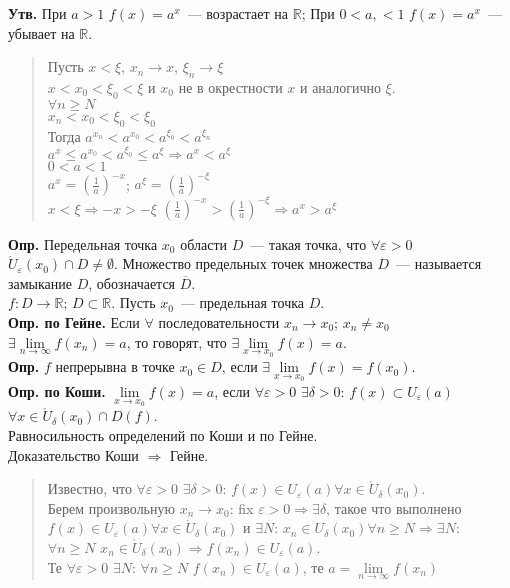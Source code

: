 \documentclass{article}
\begin{document}
	\textbf{Утв.} При $a > 1$ $f(x) = a^x$~--- возрастает на $\mathbb{R}$; При $0 < a,< 1$ $f(x) = a^x$~--- убывает на $\mathbb{R}$.
	\begin{quote}
		Пусть $x < \xi$, $x_n \rightarrow x$, $\xi_n \rightarrow \xi$ \\
		$x < x_0 < \xi_0 < \xi$ и $x_0$ не в окрестности $x$ и аналогично $\xi$. \\
		$\forall n \geqslant N$ \\
		$x_n < x_0 < \xi_0 < \xi_0$ \\
		Тогда $a^{x_n} < a^{x_0} < a^{\xi_0} < a^{\xi_n}$ \\
		$a^{x} \leqslant a^{x_0} < a^{\xi_0} \leqslant a^{\xi} \Rightarrow a^x < a^{\xi}$ \\
		$0 < a < 1$ \\
		$a^x = (\frac{1}{a})^{-x}$; $a^{\xi} = (\frac{1}{a})^{-\xi}$ \\
		$x < \xi \Rightarrow -x > -\xi$ $(\frac{1}{a})^{-x} > (\frac{1}{a})^{-\xi} \Rightarrow a^x > a^{\xi}$ \\
	\end{quote}
	\textbf{Опр.} Передельная точка $x_0$ области $D$~--- такая точка, что $\forall \varepsilon > 0$ $\mathring{U}_{\varepsilon}(x_0) \cap D \not= \emptyset$. Множество предельных точек множества $D$~--- называется замыкание $D$, обозначается $\overline{D}$. \\
	$f: D \rightarrow \mathbb{R}$; $D \subset \mathbb{R}$. Пусть $x_0$~--- предельная точка $D$. \\
	\textbf{Опр.  по Гейне.} Если $\forall$ последовательности $x_n \rightarrow x_0$; $x_n \not= x_0$ $\exists \lim \limits_{n \rightarrow \infty} f(x_n) = a$, то говорят, что $\exists \lim \limits_{x \rightarrow x_0} f(x) = a$. \\
	\textbf{Опр.} $f$ непрерывна в точке $x_0 \in D$, если $\exists \lim \limits_{x \rightarrow x_0} f(x) = f(x_0)$. \\
	\textbf{Опр. по Коши.} $\lim \limits_{x \rightarrow x_0} f(x) = a$, если $\forall \varepsilon > 0$ $\exists \delta > 0$: $f(x) \subset U_{\varepsilon}(a)$ $\forall x \in \mathring{U}_{\delta}(x_0) \cap D(f)$. \\
	Равносильность определений по Коши и по Гейне. \\
	Доказательство Коши $\Rightarrow$ Гейне.
	\begin{quote}
		Известно, что $\forall \varepsilon > 0$ $\exists \delta > 0$: $f(x) \in U_{\varepsilon}(a) \forall x \in \mathring{U}_{\delta}(x_0)$. \\
		Берем произвольную $x_n \rightarrow x_0$: fix $\varepsilon > 0 \Rightarrow \exists \delta$, такое что выполнено $f(x) \in U_{\varepsilon}(a) \forall x \in \mathring{U}_{\delta}(x_0)$ и $\exists N$: $x_n \in U_{\delta}(x_0) \forall n \geqslant N \Rightarrow \exists N$: $\forall n \geqslant N$ $x_n \in \mathring{U}_{\delta}(x_0) \Rightarrow f(x_n) \in U_{\varepsilon}(a)$. \\
		Те $\forall \varepsilon > 0$ $\exists N$: $\forall n \geqslant N$ $f(x_n) \in U_{\varepsilon}(a)$, те $a = \lim \limits_{n \rightarrow \infty}f(x_n)$
	\end{quote}
\end{document}
